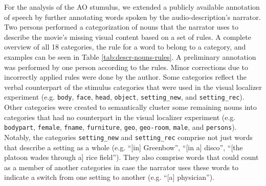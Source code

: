 \documentclass[english]{article}
\begin{document}
For the analysis of the AO stumulus, we extended a publicly available annotation
of speech \citep{haeusler2020speechanno} by further annotating words spoken by
the audio-description's narrator.
Two persons performed a categorization of nouns that the narrator uses to
describe the movie's missing visual content based on a set of rules.
A complete overview of all 18 categories, the rule for a word to belong to a
category, and examples can be seen in Table \ref{tab:descr-nouns-rules}.
A preliminary annotation was performed by one person according to the rules.
Minor corrections due to incorrectly applied rules were done by the author.
Some categories reflect the verbal counterpart of the stimulus categories that
were used in the visual localizer experiment (e.g. \texttt{body}, \texttt{face},
\texttt{head}, \texttt{object}, \texttt{setting\_new}, and
\texttt{setting\_rec}).
Other categories were created to semantically cluster some remaining nouns into
categories that had no counterpart in the visual localizer experiment (e.g.
\texttt{bodypart}, \texttt{female}, \texttt{fname}, \texttt{furniture},
\texttt{geo}, \texttt{geo-room}, \texttt{male}, and \texttt{persons}).
Notably, the categories \texttt{setting\_new} and \texttt{setting\_rec} comprise
not just words that describe a setting as a whole (e.g. ``[in] Greenbow'', ``[in
a] disco'', ``[the platoon wades through a] rice field''). They also comprise
words that could count as a member of another categories in case the narrator
uses these words to indicate a switch from one setting to another (e.g. ``[a]
physician'').
\end{document}
